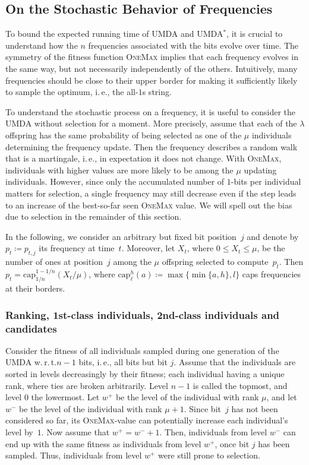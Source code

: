 \documentclass[11pt, a4paper]{article}
\newcommand*{\om}{\textsc{OneMax}\xspace}
\newcommand*{\onemax}{\om}
\newcommand{\umdastar}{UMDA$^*$\xspace}
\newcommand{\umda}{UMDA\xspace}
\newcommand{\ie}{i.\,e.\xspace}
\newcommand{\wrt}{w.\,r.\,t.\xspace}
\begin{document}
\subsection{On the Stochastic Behavior of Frequencies}
\label{sec:first-and-second-class}
To bound the expected running time of \umda and \umdastar, it is crucial to understand 
how the $n$ frequencies associated with the bits evolve over time. The symmetry of the fitness function 
\onemax implies that each frequency evolves in the same way, but not necessarily 
independently of the others. Intuitively, many frequencies should be close to their upper 
border for making it sufficiently likely to sample the optimum, \ie, the all-$1$s string.

To understand the stochastic process on a frequency, it is useful to consider the \umda 
without selection for a 
moment. More precisely, assume that each of the $\lambda$ offspring 
has the same probability of being selected as one of the $\mu$ individuals determining 
the frequency update. Then the frequency describes a random walk that 
is a martingale, \ie, in expectation it does not change. With \onemax, individuals with 
higher values are more likely to be among the $\mu$ updating individuals. However, since 
only the accumulated number of $1$-bits per individual matters for selection, 
a single frequency may still decrease even if the step leads to an increase of the best-so-far seen 
\onemax value. We will spell out the  
bias due to selection  in the remainder of this section.

In the following, we consider an arbitrary but fixed bit position~$j$ and denote by $p_t\coloneqq p_{t,j}$ its frequency at time~$t$. 
Moreover, let $X_t$, where $0\le X_t\le \mu$, be the number of ones at position~$j$ among the $\mu$ offspring 
selected to compute~$p_t$. Then $p_t=\mathrm{cap}_{1/n}^{1-1/n} (X_t/\mu)$, where $\mathrm{cap}_\ell^h (a) \coloneqq 
\max\{\min\{a,h\},l\}$  caps frequencies at their borders. 


\subsubsection*{Ranking, 1st-class individuals, 2nd-class individuals and candidates}
Consider the fitness of all individuals sampled during one generation of the \umda \wrt $n - 1$ 
bits, \ie, all bits but bit $j$. Assume that the individuals are sorted 
in levels decreasingly by their fitness; each individual having a unique rank, where ties 
are broken arbitrarily. Level $n - 1$ is called 
the topmost, and level $0$ the lowermost. 
Let $w^+$ be the level of 
the individual with rank $\mu$, and let $w^-$ be the level of the individual with rank $\mu + 1$. 
Since bit~$j$ has not been considered so far, its \om-value can potentially increase each 
individual’s level by~$1$. Now assume that $w^+ = w^- + 1$. Then, individuals from level 
$w^-$ can end up with the same fitness as individuals from level $w^+$, once bit $j$ has been sampled. 
Thus, individuals from 
level $w^+$ were still prone to selection.
\end{document}
